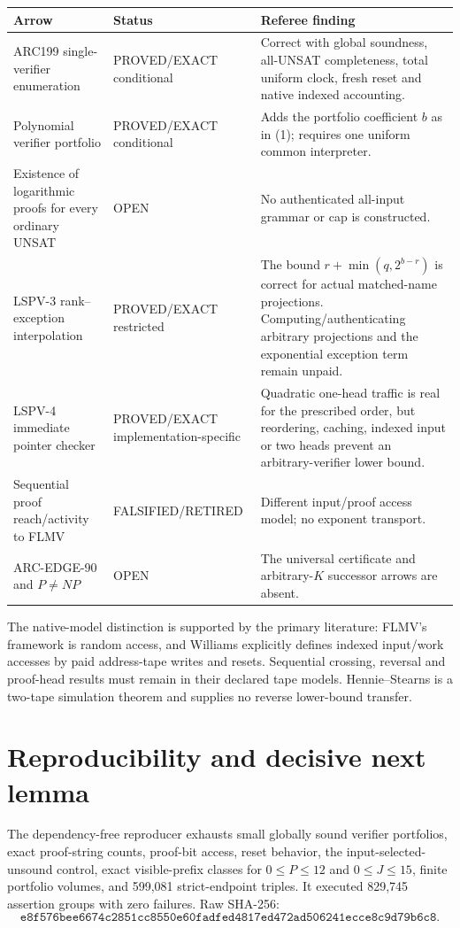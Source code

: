 \documentclass[11pt]{article}
\begin{document}
\begin{center}\small
\begin{tabularx}{.97\linewidth}{p{.34\linewidth}p{.20\linewidth}X}
\toprule
Arrow & Status & Referee finding\\\midrule
ARC199 single-verifier enumeration & PROVED/EXACT conditional & Correct with global soundness, all-UNSAT completeness, total uniform clock, fresh reset and native indexed accounting.\\
Polynomial verifier portfolio & PROVED/EXACT conditional & Adds the portfolio coefficient $b$ as in (1); requires one uniform common interpreter.\\
Existence of logarithmic proofs for every ordinary UNSAT & OPEN & No authenticated all-input grammar or cap is constructed.\\
LSPV-3 rank--exception interpolation & PROVED/EXACT restricted & The bound $r+\min(q,2^{b-r})$ is correct for actual matched-name projections.  Computing/authenticating arbitrary projections and the exponential exception term remain unpaid.\\
LSPV-4 immediate pointer checker & PROVED/EXACT implementation-specific & Quadratic one-head traffic is real for the prescribed order, but reordering, caching, indexed input or two heads prevent an arbitrary-verifier lower bound.\\
Sequential proof reach/activity to FLMV & FALSIFIED/RETIRED & Different input/proof access model; no exponent transport.\\
ARC-EDGE-90 and $P\ne NP$ & OPEN & The universal certificate and arbitrary-$K$ successor arrows are absent.\\
\bottomrule
\end{tabularx}
\end{center}

The native-model distinction is supported by the primary literature: FLMV's framework is random access, and Williams explicitly defines indexed input/work accesses by paid address-tape writes and resets.  Sequential crossing, reversal and proof-head results must remain in their declared tape models.  Hennie--Stearns is a two-tape simulation theorem and supplies no reverse lower-bound transfer.

\section{Reproducibility and decisive next lemma}

The dependency-free reproducer exhausts small globally sound verifier portfolios, exact proof-string counts, proof-bit access, reset behavior, the input-selected-unsound control, exact visible-prefix classes for $0\le P\le12$ and $0\le J\le15$, finite portfolio volumes, and 599,081 strict-endpoint triples.  It executed 829,745 assertion groups with zero failures.  Raw SHA-256:
\[
\texttt{e8f576bee6674c2851cc8550e60fadfed4817ed472ad506241ecce8c9d79b6c8}.
\]
\end{document}
